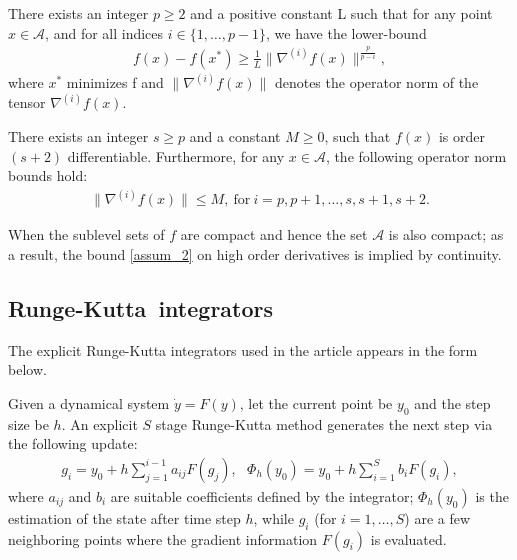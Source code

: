 \begin{assumption}\label{assumption1}
  There exists an integer $p \geq 2$ and a positive constant L such that for any point $x \in \mathcal{A}$, and for all indices $i \in \{1,\ldots,p-1\}$, we have the lower-bound
  \begin{align}\label{assum_1}
    f(x) - f(x^{*}) \geq \frac{1}{L} \| \nabla^{(i)}f(x) \|^{\frac{p}{p-i}},
  \end{align}
  where $x^{*}$ minimizes f and $\| \nabla^{(i)}f(x) \|$ denotes the operator norm of the tensor $\nabla^{(i)}f(x)$.
\end{assumption}

\begin{assumption}\label{assumption2}
  There exists an integer $s \geq p$ and a constant $M \geq 0$, such that $f(x)$ is order $(s+2)$ differentiable. Furthermore, for any $x \in \mathcal{A}$, the following operator norm bounds hold:
  \begin{align}\label{assum_2}
    \| \nabla^{(i)}f(x) \| \leq M,\ \text{for}\ i = p,p+1,\ldots,s,s+1,s+2.
  \end{align}
\end{assumption}

When the sublevel sets of $f$ are compact and hence the set $\mathcal{A}$ is also compact; as a result, the bound \eqref{assum_2} on high order derivatives is implied by continuity.

\subsection{Runge-Kutta\ integrators}

The explicit Runge-Kutta integrators used in the article appears in the form below.

\begin{definition}
  Given a dynamical system $\dot{y} = F(y)$, let the current point be $y_{0}$ and the step size be $h$. An explicit $S$ stage Runge-Kutta method generates the next step via the following update:
  \begin{align}\label{def_1}
    g_{i} = y_{0} + h \sum\limits_{j=1}^{i-1} a_{ij}F(g_{j}),\ \ \ \Phi_{h}(y_{0}) = y_{0}
    + h \sum\limits_{i=1}^{S} b_{i}F(g_{i}),
  \end{align}
  where $a_{ij}$ and $b_{i}$ are suitable coefficients defined by the integrator; $\Phi_{h}(y_{0})$ is the estimation of the state after time step $h$, while $g_i$ (for $i = 1,\ldots,S$) are a few neighboring points where the gradient information $F(g_i)$ is evaluated.
\end{definition}

